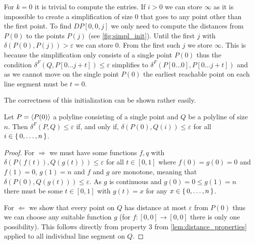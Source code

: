 For \(k = 0\) it is trivial to compute the entries. If \(i > 0\) we can store \(\infty\) as it is impossible to create a simplification of size \(0\) that goes to any point other than the first point. To find \(DP[0, 0, j]\) we only need to compute the distances from \(P(0)\) to the points \(P(j)\) (see \cref{fig:simpl_init}). Until the first \(j\) with \(\delta(P(0), P(j)) > \varepsilon\) we can store \(0\). From the first such \(j\) we store \(\infty\). This is because the simplification only consists of a single point \(P(0)\) thus the condition \(\delta^F(Q, P[0\dots j + t]) \leq \varepsilon\) simplifies to \(\delta^F(P[0 \dots 0], P[0 \dots j + t])\) and as we cannot move on the single point \(P(0)\) the earliest reachable point on each line segment must be \(t = 0\). 

The correctness of this initialization can be shown rather easily. 
\begin{lemma}
  Let \(P = \left\langle P(0)\right\rangle\) a polyline consisting of a single point and \(Q\) be a polyline of size \(n\). Then \(\delta^F(P, Q) \leq \varepsilon\) if, and only if, \(\delta(P(0), Q(i)) \leq \varepsilon\) for all \(i \in \set{0, \dots, n}\). 
\end{lemma}
\begin{proof}
  For \(\Rightarrow\) we must have some functions \(f,q\) with \(\delta(P(f(t)), Q(g(t))) \leq \varepsilon\) for all \(t\in [0,1]\) where \(f(0) = g(0) = 0\) and \(f(1) = 0\), \(g(1) = n\) and \(f\) and \(g\) are  monotone, meaning that \(\delta(P(0), Q(g(t))) \leq \varepsilon\). As \(g\) is continuous and \(g(0) = 0 \leq g(1) = n\) there must be some \(t \in [0,1]\) with \(g(t) = x\) for any \(x\in \set{0, \dots, n}\).
  
  For \(\Leftarrow\) we show that every point on \(Q\) has distance at most \(\varepsilon\) from \(P(0)\) thus we can choose any suitable function \(g\) (for \(f:[0,0] \to [0,0]\) there is only one possibility). This follows directly from property 3 from \cref{lem:distance_properties} applied to all individual line segment on \(Q\).
\end{proof}

